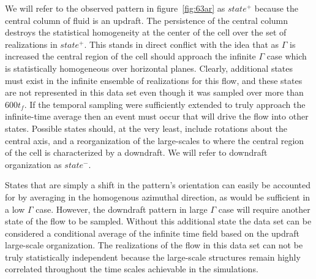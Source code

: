 \documentclass[twocolumn,10pt]{tsfp}
\begin{document}
We will refer to the observed pattern in figure~\ref{fig:63ar} as $state^+$ because the central column of fluid is an updraft. The persistence of the central column destroys the statistical homogeneity at the center of the cell over the set of realizations in $state^+$. This stands in direct conflict with the idea that as $\Gamma$ is increased the central region of the cell should approach the infinite $\Gamma$ case which is statistically homogeneous over horizontal planes. Clearly, additional states must exist in the infinite ensemble of realizations for this flow, and these states are not represented in this data set even though it was sampled over more than 600$t_f$.  If the temporal sampling were sufficiently extended to truly approach the infinite-time average then an event must occur that will drive the flow into other states.  Possible states should, at the very least, include rotations about the central axis, and a reorganization of the large-scales to where the central region of the cell is characterized by a downdraft.  We will refer to downdraft organization as $state^-$. 

States that are simply a shift in the pattern's orientation can easily be accounted for by averaging in the homogenous azimuthal direction, as would be sufficient in a low $\Gamma$ case. However, the downdraft pattern in large $\Gamma$ case will require another state of the flow to be sampled. Without this additional state the data set can be considered a conditional average of the infinite time field based on the updraft large-scale organization.  The realizations of the flow in this data set can not be truly statistically independent because the large-scale structures remain highly correlated throughout the time scales achievable in the simulations.

  
\end{document}
